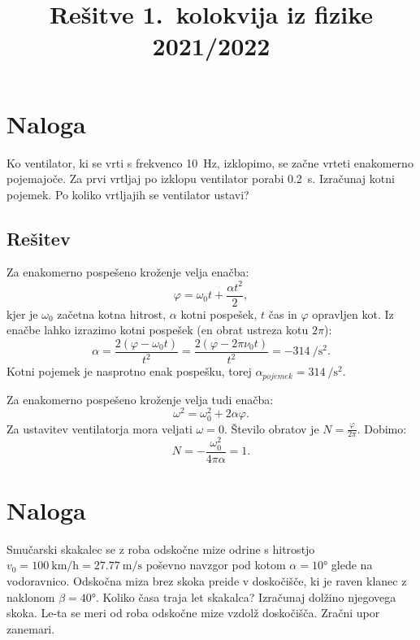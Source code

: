 \documentclass[a4,11pt]{article}
\title{Rešitve 1.~kolokvija iz fizike 2021/2022}
\author{}
\date{}
\begin{document}
\maketitle

\section{Naloga}
    Ko ventilator, ki se vrti s frekvenco \qty{10}{\Hz}, izklopimo, se začne vrteti enakomerno pojemajoče.
    Za prvi vrtljaj po izklopu ventilator porabi \qty{0.2}{\s}. Izračunaj kotni pojemek. Po koliko vrtljajih
    se ventilator ustavi?

\subsection*{Rešitev}
    Za enakomerno pospešeno kroženje velja enačba:
    \[\varphi = \omega_0 t + \frac{\alpha t^2}{2},\]
    kjer je \(\omega_0\) začetna kotna hitrost, \(\alpha\) kotni pospešek, \(t\) čas in \(\varphi\) opravljen kot.
    Iz enačbe lahko izrazimo kotni pospešek (en obrat ustreza kotu \(2\pi\)):
    \[\alpha = \frac{2\left(\varphi - \omega_0 t\right)}{t^2} = \frac{2\left(\varphi - 2\pi\nu_0 t\right)}{t^2} = \qty{-314}{\per\second\squared}.\]
    Kotni pojemek je nasprotno enak pospešku, torej \(\alpha_{pojemek} = \qty{314}{\per\second\squared}\).

    Za enakomerno pospešeno kroženje velja tudi enačba:
    \[\omega^2 = \omega_0^2 + 2\alpha \varphi.\]
    Za ustavitev ventilatorja mora veljati \(\omega = 0\). Število obratov je \(N = \frac{\varphi}{2\pi}\). Dobimo:
    \[N = -\frac{\omega_0^2}{4\pi\alpha} = 1.\]

\section{Naloga}
    Smučarski skakalec se z roba odskočne mize odrine s hitrostjo \(v_0 = \qty{100}{\kilo\metre\per\hour} = \qty{27.77}{\metre\per\second}\) poševno navzgor
    pod kotom \(\alpha = \ang{10}\) glede na vodoravnico. Odskočna miza brez skoka preide v doskočišče, ki je
    raven klanec z naklonom \(\beta = \ang{40}\). Koliko časa traja let skakalca? Izračunaj dolžino njegovega
    skoka. Le-ta se meri od roba odskočne mize vzdolž doskočišča. Zračni upor zanemari.
\end{document}
